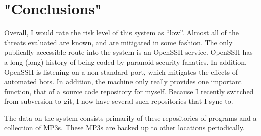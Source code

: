\documentclass[11pt]{article}
\begin{document}
\begin{longtable}{| p{1.0in} || p{1.0in} | p{3.5in} |}

\end{longtable}

\section{"Conclusions"}

Overall, I would rate the risk level of this system as ``low''.  Almost all 
of the threats evaluated are known, and are mitigated in some fashion.  The 
only publically accessible route into the system is an OpenSSH service. 
OpenSSH has a long (long) history of being coded by paranoid security fanatics.
In addition, OpenSSH is listening on a non-standard port, which mitigates
the effects of automated bots. In addition, the machine only really provides 
one important function, that of a source code repository for myself. Because
I recently switched from subversion to git, 
I now have several such repositories that I sync to.

The data on the system consists primarily of these repositories of 
programs and a collection of MP3s.  These MP3s are backed up to other locations
periodically.  
\end{document}

